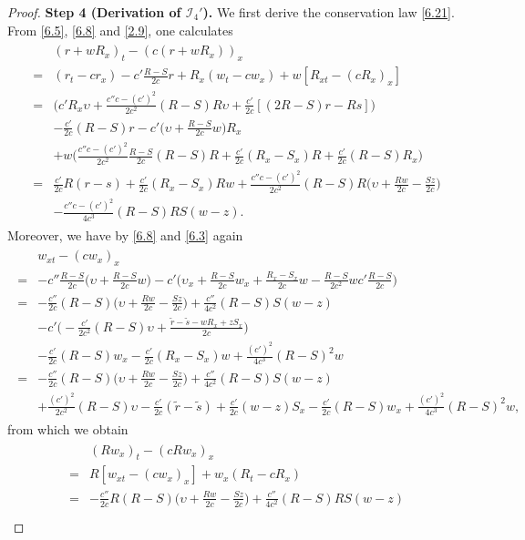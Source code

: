 \documentclass[11pt,reqno]{article}
\newcommand{\fr}{\frac}
\numberwithin{equation}{section}
\begin{document}
\begin{proof}
\textbf{Step 4 (Derivation of $\mathcal{I}_{4}'$).} We first derive the conservation law \eqref{6.21}. From \eqref{6.5}, \eqref{6.8} and \eqref{2.9}, one calculates
\begin{align}\label{6.36}
\begin{split}
&(r+wR_x)_t-(c(r+wR_x))_x \\
=& (r_t-cr_x) -c'\fr{R-S}{2c}r +R_x(w_t-cw_x) +w[R_{xt}-(cR_x)_x] \\
=&\Big(c'R_x\upsilon +\fr{c''c-(c')^2}{2c^2}(R-S)R\upsilon +\fr{c'}{2c}[(2R-S)r-Rs]\Big) \\ &-\fr{c'}{2c}(R-S)r -c'\Big(\upsilon+\fr{R-S}{2c}w\Big)R_x \\
&+w\Big(\fr{c''c-(c')^2}{2c^2}\fr{R-S}{2c}(R-S)R +\fr{c'}{2c}(R_x-S_x)R +\fr{c'}{2c}(R-S)R_x\Big) \\
=&\fr{c'}{2c}R(r-s) +\fr{c'}{2c}(R_x-S_x)Rw +\fr{c''c-(c')^2}{2c^2}(R-S)R\Big(\upsilon+\fr{Rw}{2c}-\fr{Sz}{2c}\Big) \\
&-\fr{c''c-(c')^2}{4c^3}(R-S)RS(w-z).
\end{split}
\end{align}
Moreover, we have by \eqref{6.8} and \eqref{6.3} again
\begin{align*}
\begin{split}
&w_{xt}-(cw_x)_x\\
=&-c''\fr{R-S}{2c}\Big(\upsilon+\fr{R-S}{2c}w\Big)-c'\Big(\upsilon_x+\fr{R-S}{2c}w_x +\fr{R_x-S_x}{2c}w -\fr{R-S}{2c^2}wc'\fr{R-S}{2c}\Big) \\
=&-\fr{c''}{2c}(R-S)\Big(\upsilon+\fr{Rw}{2c}-\fr{Sz}{2c}\Big) +\fr{c''}{4c^2}(R-S)S(w-z) \\
&-c'\Big(-\fr{c'}{2c^2}(R-S)\upsilon +\fr{\tilde{r}-\tilde{s}-wR_x+zS_x}{2c}\Big) \\
&-\fr{c'}{2c}(R-S)w_x -\fr{c'}{2c}(R_x-S_x)w +\fr{(c')^2}{4c^3}(R-S)^2w \\
=& -\fr{c''}{2c}(R-S)\Big(\upsilon+\fr{Rw}{2c}-\fr{Sz}{2c}\Big) +\fr{c''}{4c^2}(R-S)S(w-z) \\
&+\fr{(c')^2}{2c^2}(R-S)\upsilon -\fr{c'}{2c}(\tilde{r}-\tilde{s}) +\fr{c'}{2c}(w-z)S_x -\fr{c'}{2c}(R-S)w_x +\fr{(c')^2}{4c^3}(R-S)^2w,
\end{split}
\end{align*}
from which we obtain
\begin{align}\label{6.37}
\begin{split}
&(Rw_{x})_t-(cRw_x)_x\\
=&R[w_{xt}-(cw_x)_x] +w_x(R_t-cR_x) \\
=&-\fr{c''}{2c}R(R-S)\Big(\upsilon+\fr{Rw}{2c}-\fr{Sz}{2c}\Big) +\fr{c''}{4c^2}(R-S)RS(w-z) \\

\end{split}
\end{align}
\end{proof}
\end{document}
